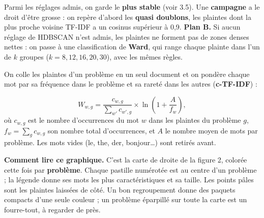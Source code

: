 \begin{stepbox}[title={3.3\quad Régler le regroupement sur les données elles-mêmes}]
Parmi les réglages admis, on garde le \textbf{plus stable} (voir 3.5). Une \textbf{campagne} a le droit
d'être grosse : on repère d'abord les \textbf{quasi doublons}, les plaintes dont la plus proche voisine
TF-IDF a un cosinus supérieur à 0,9.
\textbf{Plan B.} Si aucun réglage de HDBSCAN n'est admis, les plaintes ne forment pas de zones denses
nettes : on passe à une classification de \textbf{Ward}, qui range chaque plainte dans l'un de $k$ groupes
($k = 8, 12, 16, 20, 30$), avec les mêmes règles.
\end{stepbox}


\begin{stepbox}[title={3.4\quad Nommer chaque problème par ses mots caractéristiques}]
On colle les plaintes d'un problème en un seul document et on pondère chaque mot par sa fréquence
dans le problème et sa rareté dans les autres (\textbf{c-TF-IDF}) :
\begin{formulabox}
\[
W_{w,g} = \frac{c_{w,g}}{\sum_{w'} c_{w',g}} \times \ln\!\left(1 + \frac{A}{f_w}\right),
\]
où $c_{w,g}$ est le nombre d'occurrences du mot $w$ dans les plaintes du problème $g$, $f_w = \sum_g c_{w,g}$
son nombre total d'occurrences, et $A$ le nombre moyen de mots par problème. Les mots vides (le, the,
der, bonjour\ldots) sont retirés avant.
\end{formulabox}
\end{stepbox}


\begin{lire}
\textbf{Comment lire ce graphique.} C'est la carte de droite de la figure 2, colorée cette fois par
\textbf{problème}. Chaque pastille numérotée est au centre d'un problème ; la légende donne ses mots les
plus caractéristiques et sa taille. Les points pâles sont les plaintes laissées de côté. Un bon
regroupement donne des paquets compacts d'une seule couleur ; un problème éparpillé sur toute la carte est
un fourre-tout, à regarder de près.
\end{lire}

